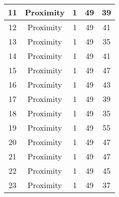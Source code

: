 \documentclass[results.tex]{subfiles}
\begin{document}
\begin{center}
\begin{tabular}{| c || c | c | c | c |}
            \hline
            11                      & Proximity                    & 1                      & 49                      & 39                   \\
            \hline
            12                      & Proximity                    & 1                      & 49                      & 41                   \\
            \hline
            13                      & Proximity                    & 1                      & 49                      & 35                   \\
            \hline
            14                      & Proximity                    & 1                      & 49                      & 41                   \\
            \hline
            15                      & Proximity                    & 1                      & 49                      & 47                   \\
            \hline
            16                      & Proximity                    & 1                      & 49                      & 43                   \\
            \hline
            17                      & Proximity                    & 1                      & 49                      & 39                   \\
            \hline
            18                      & Proximity                    & 1                      & 49                      & 35                   \\
            \hline
            19                      & Proximity                    & 1                      & 49                      & 55                   \\
            \hline
            20                      & Proximity                    & 1                      & 49                      & 47                   \\
            \hline
            21                      & Proximity                    & 1                      & 49                      & 47                   \\
            \hline
            22                      & Proximity                    & 1                      & 49                      & 45                   \\
            \hline
            23                      & Proximity                    & 1                      & 49                      & 37                   \\

\end{tabular}
\end{center}
\end{document}

